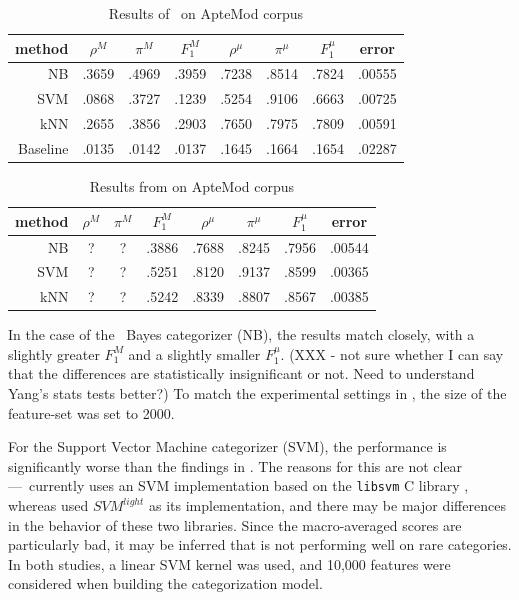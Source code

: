 \begin{table} \label{aptemod-results}
\begin{center}
\begin{tabular}{|r c c c c c c c|}
\hline
method    & $\rho^M$ & $\pi^M$ & $F_1^M$ & $\rho^\mu$ & $\pi^\mu$ & $F_1^\mu$ &   error \\
\hline
NB        &   .3659  &  .4969  &  .3959  &  .7238     &  .8514    &  .7824    &  .00555 \\
SVM       &   .0868  &  .3727  &  .1239  &  .5254     &  .9106    &  .6663    &  .00725 \\
kNN       &   .2655  &  .3856  &  .2903  &  .7650     &  .7975    &  .7809    &  .00591 \\
Baseline  &   .0135  &  .0142  &  .0137  &  .1645     &  .1664    &  .1654    &  .02287 \\
\hline
\end{tabular}
\end{center}
\caption{Results of \aicat\ on ApteMod corpus}
\end{table}

\begin{table} \label{aptemod-yang}
\begin{center}
\begin{tabular}{|r c c c c c c c|}
\hline
method & $\rho^M$ & $\pi^M$ & $F_1^M$ & $\rho^\mu$ & $\pi^\mu$ & $F_1^\mu$ & error \\
\hline
NB  & ? & ? & .3886 & .7688 & .8245 & .7956 & .00544 \\
SVM & ? & ? & .5251 & .8120 & .9137 & .8599 & .00365 \\
kNN & ? & ? & .5242 & .8339 & .8807 & .8567 & .00385 \\
\hline
\end{tabular}
\end{center}
\caption{Results from \cite{yang:99} on ApteMod corpus}
\end{table}

In the case of the \naive\ Bayes categorizer (NB), the results match
\cite{yang:99} closely, with a slightly greater $F_1^M$ and a slightly
smaller $F_1^\mu$. (XXX - not sure whether I can say that the
differences are statistically insignificant or not.  Need to
understand Yang's stats tests better?)  To match the experimental
settings in \cite{yang:99}, the size of the feature-set was set to
2000.

For the Support Vector Machine categorizer (SVM), the performance is
significantly worse than the findings in \cite{yang:99}.  The reasons
for this are not clear---\aicat\ currently uses an SVM implementation
based on the \texttt{libsvm} C library \cite{libsvm}, whereas
\cite{yang:99} used $SVM^{light}$ as its
implementation\cite{joachims:99a}, and there may be major differences
in the behavior of these two libraries.  Since the macro-averaged scores are
particularly bad, it may be inferred that \cite{libsvm} is not
performing well on rare categories.  In both studies, a linear SVM
kernel was used, and 10,000 features were considered when building the
categorization model.

